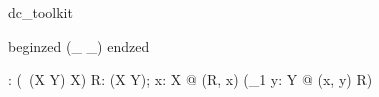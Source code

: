 
\begin{zsection}
   \SECTION dc\_toolkit 
\end{zsection}

begin{zed}
    \relation (\_ \appliesTo \_)
end{zed}

\begin{gendef}[X, Y]
   \appliesTo : \power(\power~(X \cross Y) \cross X)
\where
   \forall R: \power(X \cross Y); x: X @ (R, x) \in \appliesTo \iff (\exists_1 y: Y @ (x, y) \in R)
\end{gendef} 